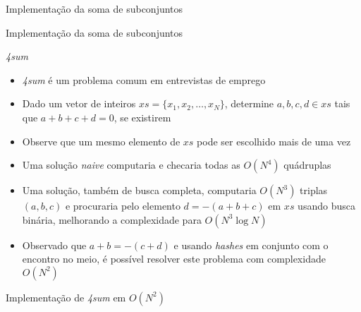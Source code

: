 

\begin{frame}[fragile]{Implementação da soma de subconjuntos}
\end{frame}

\begin{frame}[fragile]{Implementação da soma de subconjuntos}
\end{frame}

\begin{frame}[fragile]{\it 4sum}

    \begin{itemize}
        \item \textit{4sum} é um problema comum em entrevistas de emprego

        \item Dado um vetor de inteiros $xs = \lbrace x_1, x_2, \ldots, x_N\rbrace$, determine 
            $a, b, c, d\in xs$ tais que $a + b + c + d = 0$, se existirem

        \item Observe que um mesmo elemento de $xs$ pode ser escolhido mais de uma vez

        \item Uma solução \textit{naive} computaria e checaria todas as $O(N^4)$ quádruplas

        \item Uma solução, também de busca completa, computaria $O(N^3)$ triplas $(a, b, c)$ e 
            procuraria pelo elemento $d = -(a + b + c)$ em $xs$ usando busca binária, melhorando
            a complexidade para $O(N^3\log N)$

        \item Observado que $a + b = -(c + d)$ e usando \textit{hashes} em conjunto com o encontro
            no meio, é possível resolver este problema com complexidade $O(N^2)$
    \end{itemize}

\end{frame}

\begin{frame}[fragile]{Implementação de {\it 4sum} em $O(N^2)$}
\end{frame}
